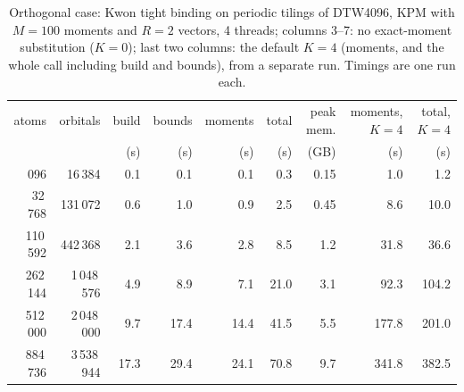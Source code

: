 \begin{table}[t]\caption{Orthogonal case: Kwon tight binding on periodic tilings of DTW4096, KPM with $M=100$ moments and $R=2$ vectors, 4 threads; columns 3--7: no exact-moment substitution ($K=0$); last two columns: the default $K=4$ (moments, and the whole call including build and bounds), from a separate run. Timings are one run each.}\label{tab:kw}\begin{ruledtabular}\begin{tabular}{rrrrrrrrr}
atoms & orbitals & build & bounds & moments & total & peak mem. & moments, $K=4$ & total, $K=4$ \\ & & (s) & (s) & (s) & (s) & (GB) & (s) & (s) \\ \colrule
4\,096 & 16\,384 & 0.1 & 0.1 & 0.1 & 0.3 & 0.15 & 1.0 & 1.2 \\
32\,768 & 131\,072 & 0.6 & 1.0 & 0.9 & 2.5 & 0.45 & 8.6 & 10.0 \\
110\,592 & 442\,368 & 2.1 & 3.6 & 2.8 & 8.5 & 1.2 & 31.8 & 36.6 \\
262\,144 & 1\,048\,576 & 4.9 & 8.9 & 7.1 & 21.0 & 3.1 & 92.3 & 104.2 \\
512\,000 & 2\,048\,000 & 9.7 & 17.4 & 14.4 & 41.5 & 5.5 & 177.8 & 201.0 \\
884\,736 & 3\,538\,944 & 17.3 & 29.4 & 24.1 & 70.8 & 9.7 & 341.8 & 382.5 \\
\end{tabular}\end{ruledtabular}\end{table}
